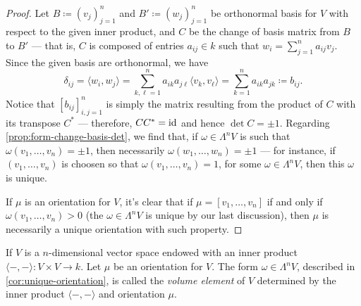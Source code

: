 \begin{proof}
Let \(B \coloneq (v_j)_{j=1}^n\) and \(B' \coloneq (w_j)_{j=1}^n\) be
orthonormal basis for \(V\) with respect to the given inner product, and \(C\)
be the change of basis matrix from \(B\) to \(B'\) --- that is, \(C\) is
composed of entries \(a_{ij} \in k\) such that \(w_i = \sum_{j=1}^n a_{ij}v_j\).
Since the given basis are orthonormal, we have
\[
  \delta_{i j} = \langle w_i, w_j \rangle
  = \sum_{k, \ell = 1}^n a_{i k} a_{j \ell} \langle v_k, v_{\ell} \rangle
  = \sum_{k=1}^n a_{i k} a_{j k}
  \coloneq b_{i j}.
\]
Notice that \([b_{ij}]_{i,j=1}^n\) is simply the matrix resulting from the
product of \(C\) with its transpose \(C^{*}\) --- therefore, \(C C^{*} = \operatorname{id}\)
and hence \(\det C = \pm 1\). Regarding \cref{prop:form-change-basis-det}, we
find that, if \(\omega \in \Lambda^{n} V\) is such that \(\omega(v_1, \dots,
v_n) = \pm 1\), then necessarily \(\omega(w_1, \dots, w_n) = \pm 1\) --- for
instance, if \((v_1, \dots, v_n)\) is choosen so that \(\omega(v_1, \dots, v_n)
= 1\), for some \(\omega \in \Lambda^n V\), then this \(\omega\) is unique.

If \(\mu\) is an orientation for \(V\), it's clear that if \(\mu = [v_1, \dots,
v_n]\) if and only if \(\omega(v_1, \dots, v_n) > 0\) (the \(\omega \in
\Lambda^n V\) is unique by our last discussion), then \(\mu\) is necessarily a
unique orientation with such property.
\end{proof}

\begin{definition}
\label{def:volume-element-vector-space}
If \(V\) is a \(n\)-dimensional vector space endowed with an inner product
\(\langle -, - \rangle: V \times V \to k\). Let \(\mu\) be an orientation for
\(V\). The form \(\omega \in \Lambda^n V\), described in
\cref{cor:unique-orientation}, is called the \emph{volume element} of \(V\)
determined by the inner product \(\langle -, - \rangle\) and orientation
\(\mu\).
\end{definition}


